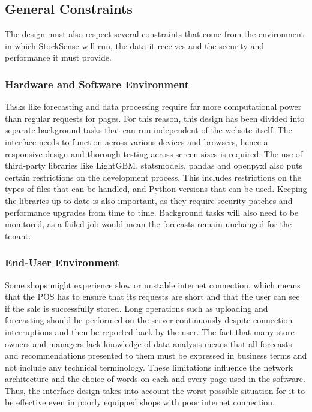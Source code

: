 \documentclass{StockSense}
\begin{document}
\subsection{General Constraints}

The design must also respect several constraints that come from the environment in which StockSense will run, the data it receives and the security and performance it must provide.

\subsubsection{Hardware and Software Environment}

Tasks like forecasting and data processing require far more computational power than regular requests for pages. For this reason, this design has been divided into separate background tasks that can run independent of the website itself. The interface needs to function across various devices and browsers, hence a responsive design and thorough testing across screen sizes is required. The use of third-party libraries like LightGBM, statsmodels, pandas and openpyxl also puts certain restrictions on the development process. This includes restrictions on the types of files that can be handled, and Python versions that can be used. Keeping the libraries up to date is also important, as they require security patches and performance upgrades from time to time. Background tasks will also need to be monitored, as a failed job would mean the forecasts remain unchanged for the tenant.

\subsubsection{End-User Environment}

Some shops might experience slow or unstable internet connection, which means that the POS has to ensure that its requests are short and that the user can see if the sale is successfully stored. Long operations such as uploading and forecasting should be performed on the server continuously despite connection interruptions and then be reported back by the user. The fact that many store owners and managers lack knowledge of data analysis means that all forecasts and recommendations presented to them must be expressed in business terms and not include any technical terminology. These limitations influence the network architecture and the choice of words on each and every page used in the software. Thus, the interface design takes into account the worst possible situation for it to be effective even in poorly equipped shops with poor internet connection.
\end{document}
